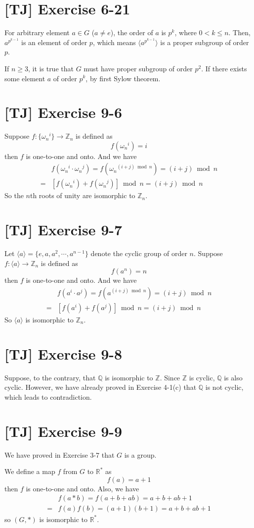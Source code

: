 \documentclass[a4paper,11pt,twocolumn]{article}
\begin{document}
  \section{[TJ] Exercise 6-21}
  For arbitrary element $a \in G$ ($a \neq e$), the order of $a$ is $p^k$, where $0 < k \leq n$. Then, $a^{p^{k-1}}$ is an element of order $p$, which means $\langle a^{p^{k-1}} \rangle$ is a proper subgroup of order $p$. \par
  If $n \geq 3$, it is true that $G$ must have proper subgroup of order $p^2$. If there exists some element $a$ of order $p^k$, by first Sylow theorem.

  \section{[TJ] Exercise 9-6}
  Suppose $f: \{{\omega_n}^i\} \rightarrow \mathbb{Z}_n$ is defined as
   $$ f({\omega_n}^i) = i $$
  then $f$ is one-to-one and onto. And we have
  \begin{align*}
    & f({\omega_n}^i \cdot {\omega_n}^j) = f({\omega_n}^{(i+j) \bmod n}) = (i+j) \bmod n \\
   =& [f({\omega_n}^i) + f({\omega_n}^j)] \bmod n = (i + j) \bmod n
  \end{align*}
  So the $n$th roots of unity are isomorphic to $\mathbb{Z}_n$.

  \section{[TJ] Exercise 9-7}
  Let $\langle a \rangle = \{e, a, a^2, \cdots, a^{n-1}\}$ denote the cyclic group of order $n$. Suppose $f: \langle a \rangle \rightarrow \mathbb{Z}_n$ is defined as
  $$ f(a^n) = n $$
  then $f$ is one-to-one and onto. And we have
  \begin{align*}
    & f(a^i \cdot a^j) = f(a^{(i+j) \bmod n}) = (i+j) \bmod n\\
   =& [f(a^i) + f(a^j)] \bmod n = (i + j) \bmod n
  \end{align*}
  So $\langle a \rangle$ is isomorphic to $\mathbb{Z}_n$.

  \section{[TJ] Exercise 9-8}
  Suppose, to the contrary, that $\mathbb{Q}$ is isomorphic to $\mathbb{Z}$. Since $\mathbb{Z}$ is cyclic, $\mathbb{Q}$ is also cyclic. However, we have already proved in Exercise 4-1(c) that $\mathbb{Q}$ is not cyclic, which leads to contradiction.

  \section{[TJ] Exercise 9-9}
  We have proved in Exercise 3-7 that $G$ is a group. \par
  We define a map $f$ from $G$ to $\mathbb{R}^*$ as
  $$ f(a) = a + 1 $$
  then $f$ is one-to-one and onto. Also, we have
  \begin{align*}
    & f(a * b) = f(a + b + ab) = a+b+ab+1 \\
    =& f(a)f(b) = (a+1)(b+1) = a+b+ab+1
  \end{align*}
  so $(G, *)$ is isomorphic to $\mathbb{R}^*$.
\end{document}
